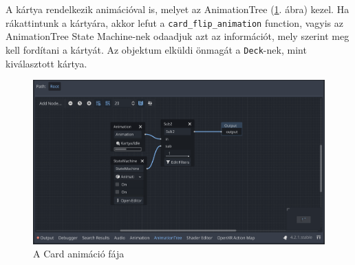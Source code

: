 A kártya rendelkezik animációval is, melyet az AnimationTree (\ref{img:animation_tree}. ábra) kezel. 
Ha rákattintunk a kártyára, akkor lefut a \lstinline|card_flip_animation| function, vagyis az AnimationTree State Machine-nek odaadjuk azt az információt, mely szerint meg kell fordítani a kártyát. Az objektum elküldi önmagát a \lstinline|Deck|-nek, mint kiválasztott kártya. 
\begin{figure}[h]
    \centering
    \includegraphics[width=\textwidth]{img/animation_tree.png}
    \caption{A Card animáció fája}
    \label{img:animation_tree}  
\end{figure}



